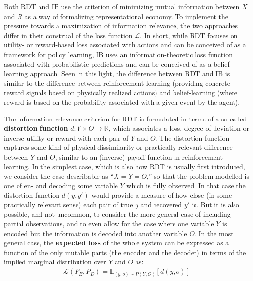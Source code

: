 \documentclass[nobib,nofonts]{tufte-handout}
\begin{document}
Both RDT and IB use the criterion of minimizing mutual information between $X$ and $R$ as a way of formalizing representational economy.
To implement the pressure towards a maximization of information relevance, the two approaches differ in their construal of the loss function $\mathcal{L}$.
In short, while RDT focuses on utility- or reward-based loss associated with actions and can be conceived of as a framework for policy learning, IB uses an information-theoretic loss function associated with probabilistic predictions and can be conceived of as a belief-learning approach.
Seen in this light, the difference between RDT and IB is similar to the difference between reinforcement learning (providing concrete reward signals based on physically realized actions) and belief-learning (where reward is based on the probability associated with a given event by the agent).

The information relevance criterion for RDT is formulated in terms of a so-called \textbf{distortion function} $d \colon Y \times O \rightarrow \mathbb{R}$, which associates a loss, degree of deviation or inverse utility or reward with each pair of $Y$ and $O$.
The distortion function captures some kind of physical dissimilarity or practically relevant difference between $Y$ and $O$, similar to an (inverse) payoff function in reinforcement learning.
In the simplest case, which is also how RDT is usually first introduced, we consider the case describable as ``$X=Y=O$,'' so that the problem modelled is one of en- and decoding some variable $Y$ which is fully observed.
In that case the distortion function $d(y,y')$ would provide a measure of how close (in some practically relevant  sense) each pair of true $y$ and recovered $y'$ is.
But it is also possible, and not uncommon, to consider the more general case of including partial observations, and to even allow for the case where one variable $Y$ is encoded but the information is decoded into another variable $O$.
In the most general case, the \textbf{expected loss} of the whole system can be expressed as a function of the only mutable parts (the encoder and the decoder) in terms of the implied marginal distribution over $Y$ and $O$ as:
\begin{align*}
  \mathcal{L}(P_{E},P_{D}) = \mathbb{E}_{(y,o) \sim P(Y,O)} [d(y,o)]
\end{align*}
\end{document}
